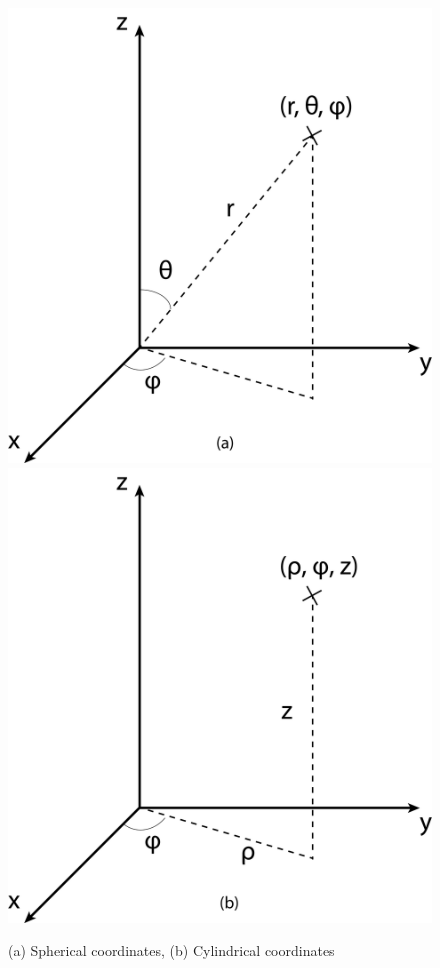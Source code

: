 \documentclass{book}
\theoremstyle{definition}
\begin{document}
\begin{figure}[h!]
	\centering
	\includegraphics[scale=0.15]{gr-fig-3a.png}
	\includegraphics[scale=0.15]{gr-fig-3b.png}
	\caption{(a) Spherical coordinates, (b) Cylindrical coordinates}
\end{figure}
\end{document}
